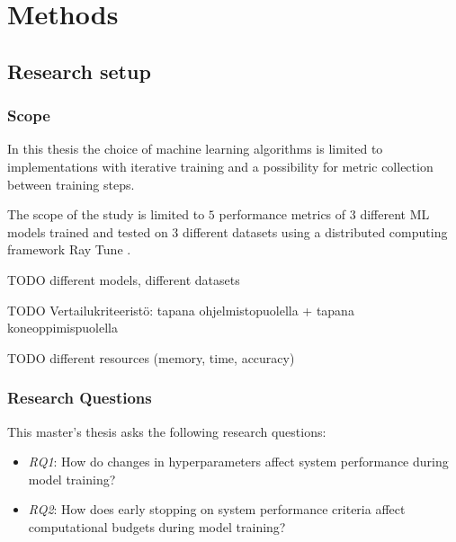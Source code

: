 \chapter{Methods}
\label{chap:methods}

\section{Research setup}
\subsection{Scope}

In this thesis the choice of machine learning algorithms is limited to implementations with iterative training and a possibility for metric collection between training steps.

The scope of the study is limited to $5$ performance metrics of $3$ different ML models trained and tested on 3 different datasets using a distributed computing framework Ray Tune \parencite{liawTuneResearchPlatform2018}.

TODO different models, different datasets

TODO Vertailukriteeristö: tapana ohjelmistopuolella + tapana koneoppimispuolella

TODO different resources (memory, time, accuracy)



\subsection{Research Questions}
This master's thesis asks the following research questions:
\begin{itemize}
    \item \emph{RQ1}: How do changes in hyperparameters affect system performance during model training?
    \item \emph{RQ2}: How does early stopping on system performance criteria affect computational budgets during model training?

\end{itemize}

